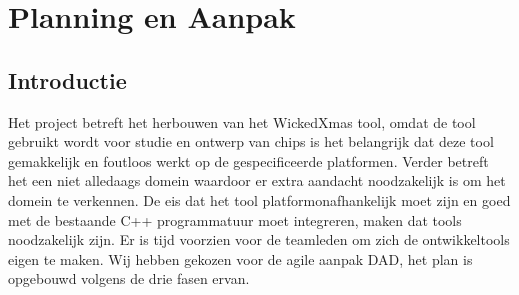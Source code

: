 
\section{Planning en Aanpak}
\subsection{Introductie}
Het project betreft het herbouwen van het WickedXmas tool, omdat de tool gebruikt wordt voor studie
en ontwerp van chips is het belangrijk dat deze tool gemakkelijk en foutloos werkt op de gespecificeerde platformen.
Verder betreft het een niet alledaags domein waardoor er extra aandacht noodzakelijk is om het domein
te verkennen. De eis dat het tool platformonafhankelijk moet zijn en goed met de bestaande C++ programmatuur
moet integreren, maken dat tools noodzakelijk zijn. Er is tijd voorzien voor de teamleden om zich de ontwikkeltools eigen te maken.
Wij hebben gekozen voor de agile aanpak DAD, het plan is opgebouwd volgens de drie fasen ervan.

